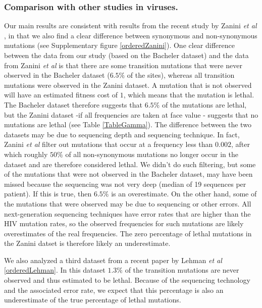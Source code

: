 \documentclass{article}
\begin{document}
\subsubsection*{Comparison with other studies in viruses.}
Our main results are consistent with results from the recent study by Zanini \textit {et al} \cite{zanini2016population}, in that we also find a clear difference between synonymous and non-synonymous mutations (see Supplementary figure \ref{orderedZanini}). One clear difference between the data from our study (based on the Bacheler dataset) and the data from Zanini \textit {et al} is that there are some transition mutations that were never observed in the Bacheler dataset ($6.5\%$ of the sites), whereas all transition mutations were observed in the Zanini dataset. 
A mutation that is not observed will have an estimated fitness cost of $1$, which means that the mutation is lethal. The Bacheler dataset therefore suggests that $6.5\%$ of the mutations are lethal, but the Zanini dataset -if all frequencies are taken at face value - suggests that no mutations are lethal (see Table \ref{TableGamma}). The difference between the two datasets may be due to sequencing depth and sequencing technique. 
In fact, Zanini {\it et al} \cite{zanini2016vivo} filter out mutations that occur at a frequency less than $0.002$, after which roughly $50\%$ of all non-synonymous mutations no longer occur in the  dataset and are therefore considered lethal.  
We didn't do such filtering, but some of the mutations that were not observed in the Bacheler dataset, may have been missed because the sequencing was not very deep (median of 19 sequences per patient). If this is true, then $6.5\%$ is an overestimate. On the other hand, some of the mutations that were observed may be due to sequencing or other errors. 
All next-generation sequencing techniques have error rates that are higher than the HIV mutation rates, so the observed frequencies for such mutations are likely overestimates of the real frequencies. The zero percentage of lethal mutations in the Zanini datset is therefore likely an underestimate. 

We also analyzed a third dataset from a recent paper by Lehman {\it et al} \cite{lehman2015risk}\ref{orderedLehman}. In this dataset $1.3\%$ of the transition mutations are never observed and thus estimated to be lethal. Because of the sequencing technology and the associated error rate, we expect that this percentage is also an underestimate of the true percentage of lethal mutations.
\end{document}
